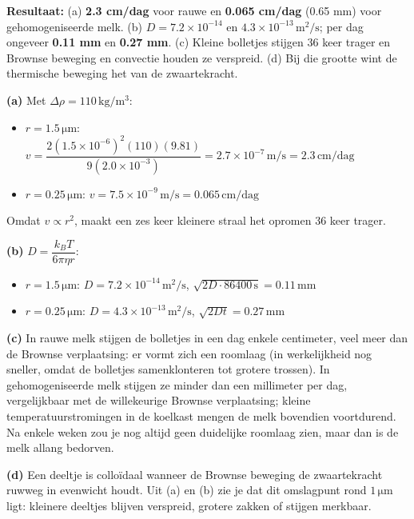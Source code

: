 \begin{oplossing}
\textbf{Resultaat:} (a) \textbf{2.3 cm/dag} voor rauwe en \textbf{0.065 cm/dag} (0.65 mm) voor gehomogeniseerde melk. (b) \(D = 7.2\times10^{-14}\) en \(4.3\times10^{-13}\,\mathrm{m^2/s}\); per dag ongeveer \textbf{0.11 mm} en \textbf{0.27 mm}. (c) Kleine bolletjes stijgen 36 keer trager en Brownse beweging en convectie houden ze verspreid. (d) Bij die grootte wint de thermische beweging het van de zwaartekracht.

\textbf{(a)} Met \(\Delta\rho = 110\,\mathrm{kg/m^3}\):

\begin{itemize}
\item
  \(r = 1.5\,\mathrm{\mu m}\): \(v = \dfrac{2(1.5\times10^{-6})^2(110)(9.81)}{9(2.0\times10^{-3})} = 2.7\times10^{-7}\,\mathrm{m/s} = 2.3\,\mathrm{cm/dag}\)
\item
  \(r = 0.25\,\mathrm{\mu m}\): \(v = 7.5\times10^{-9}\,\mathrm{m/s} = 0.065\,\mathrm{cm/dag}\)
\end{itemize}

Omdat \(v \propto r^2\), maakt een zes keer kleinere straal het opromen 36 keer trager.

\textbf{(b)} \(D = \dfrac{k_BT}{6\pi\eta r}\):

\begin{itemize}
\item
  \(r = 1.5\,\mathrm{\mu m}\): \(D = 7.2\times10^{-14}\,\mathrm{m^2/s}\), \(\sqrt{2D\cdot 86400\,\mathrm{s}} = 0.11\,\mathrm{mm}\)
\item
  \(r = 0.25\,\mathrm{\mu m}\): \(D = 4.3\times10^{-13}\,\mathrm{m^2/s}\), \(\sqrt{2Dt} = 0.27\,\mathrm{mm}\)
\end{itemize}

\textbf{(c)} In rauwe melk stijgen de bolletjes in een dag enkele centimeter, veel meer dan de Brownse verplaatsing: er vormt zich een roomlaag (in werkelijkheid nog sneller, omdat de bolletjes samenklonteren tot grotere trossen). In gehomogeniseerde melk stijgen ze minder dan een millimeter per dag, vergelijkbaar met de willekeurige Brownse verplaatsing; kleine temperatuurstromingen in de koelkast mengen de melk bovendien voortdurend. Na enkele weken zou je nog altijd geen duidelijke roomlaag zien, maar dan is de melk allang bedorven.

\textbf{(d)} Een deeltje is colloïdaal wanneer de Brownse beweging de zwaartekracht ruwweg in evenwicht houdt. Uit (a) en (b) zie je dat dit omslagpunt rond \(1\,\mathrm{\mu m}\) ligt: kleinere deeltjes blijven verspreid, grotere zakken of stijgen merkbaar.
\end{oplossing}

